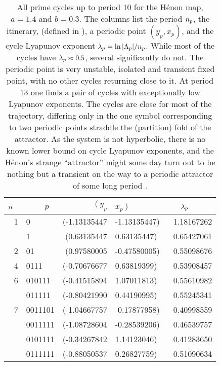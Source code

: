 \begin{table}
\caption[]{\small
All prime cycles up to period 10
for the H\'enon map, $a=1.4$ and $b=0.3$.
The columns list the period ${n_{p}}$, the itinerary,
(defined in ),
a periodic point $(y_p,x_p)$, and the cycle
Lyapunov exponent $\lambda_p=\ln|\Lambda_p|/{n_{p}}$. While
most of the cycles have $\lambda_p \approx 0.5$, several significantly
do not. The  periodic point is very unstable, isolated and
transient fixed point, with no other cycles returning close to it.
At period 13 one finds
a pair of cycles with exceptionally low Lyapunov exponents.
The cycles are close for most of the trajectory, differing only
in the one symbol corresponding to two periodic points straddle
the (partition) fold of the attractor.
As the system is not hyperbolic, there is no known
lower bound on cycle Lyapunov exponents, and the H\'enon's strange
``attractor'' might some day turn out to be nothing but
a transient on the way to a periodic attractor of some long
period%
.
}
\renewcommand{\arraystretch}{0.7}
{\small
\begin{center}
\begin{tabular}{rlr@{~,~}lr}
\hline
 ${n_{}}$~ &~~~~$p$ & $(~y_p$&$x_p~)$~~~~~~~~ & $\lambda_p$~~~~~ \\ \hline
 1 & 0 &        (-1.13135447&-1.13135447)   &    1.18167262 \\
   & 1 &         (0.63135447&0.63135447)    &   0.65427061 \\
 2 & 01 &         (0.97580005&-0.47580005)    &   0.55098676 \\
 4 & 0111 &        (-0.70676677&0.63819399)   &    0.53908457 \\
 6 & 010111 &        (-0.41515894&1.07011813)   &    0.55610982 \\
  & 011111  &        (-0.80421990&0.44190995)    &   0.55245341 \\
 7 &  0011101 &        (-1.04667757&-0.17877958)    &   0.40998559    \\
   &  0011111 &         (-1.08728604&-0.28539206)    &   0.46539757     \\
   &  0101111 &         (-0.34267842&1.14123046)    &   0.41283650    \\
   &  0111111 &         (-0.88050537&0.26827759)    &  0.51090634    \\

\end{tabular}
\end{center}}
\end{table}
